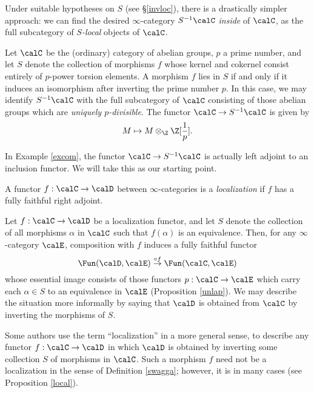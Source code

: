 Under suitable hypotheses on $S$ (see \S \ref{invloc}), there is a drastically simpler approach: we can find the desired $\infty$-category $S^{-1} \calC$ {\em inside} of $\calC$, as the full subcategory of {\em $S$-local} objects of $\calC$.

\begin{example}\label{excom}
Let $\calC$ be the (ordinary) category of abelian groups, $p$ a
prime number, and let $S$ denote the collection of morphisms $f$
whose kernel and cokernel consist entirely of $p$-power torsion elements. A
morphism $f$ lies in $S$ if and only if it induces an isomorphism
after inverting the prime number $p$. In this case, we may
identify $S^{-1} \calC$ with the full subcategory of $\calC$ consisting of those abelian groups which
are {\em uniquely $p$-divisible}. The functor $\calC \rightarrow S^{-1} \calC$ is given
by $$ M \mapsto M \otimes_{\Z} \Z[ \frac{1}{p}].$$
\end{example}

In Example \ref{excom}, the functor $\calC \rightarrow
S^{-1} \calC$ is actually left adjoint to an inclusion functor. We will take this as our starting point.

\begin{definition}\label{swagga}
A functor $f: \calC \rightarrow \calD$ between $\infty$-categories is a {\it localization}
if $f$ has a fully faithful right adjoint.
\end{definition}

\begin{warning}
Let $f: \calC \rightarrow \calD$ be a localization functor, and let $S$ denote the collection of all morphisms $\alpha$ in $\calC$ such that $f(\alpha)$ is an equivalence. Then, for any
$\infty$-category $\calE$, composition with $f$ induces a fully faithful functor
$$ \Fun( \calD, \calE) \stackrel{ \circ f}{\rightarrow} \Fun(\calC, \calE)$$
whose essential image consists of those functors $p: \calC \rightarrow \calE$ which
carry each $\alpha \in S$ to an equivalence in $\calE$ (Proposition \ref{unlap}). We may describe the situation more
informally by saying that $\calD$ is obtained from $\calC$ by inverting the morphisms of $S$.

Some authors use the term ``localization'' in a more general sense, to describe any
functor $f: \calC \rightarrow \calD$ in which $\calD$ is obtained by inverting some collection $S$ of morphisms in $\calC$. Such a morphism $f$ need not be a localization in the sense of Definition \ref{swagga}; however, it is in many cases (see Proposition \ref{local}).
\end{warning}

